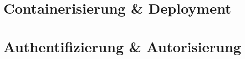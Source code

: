 \setauthor{\firstauthor}



\clearpage
\setauthor{\secondauthor}
\section{Containerisierung \& Deployment}


\setauthor{\firstauthor}
\section{Authentifizierung \& Autorisierung}

